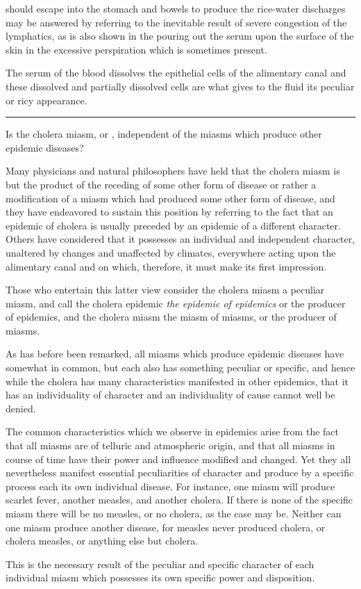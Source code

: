 should escape into the stomach and bowels to produce the rice-water
discharges may be answered by referring to the inevitable result of severe
congestion of the lymphatics, as is also shown in the pouring out the
serum upon the surface of the skin in the excessive perspiration which
is sometimes present.

The serum of the blood dissolves the epithelial cells of the alimentary
canal and these dissolved and partially dissolved cells are what gives to
the fluid its peculiar or ricy appearance.

\plainbreak{1}

Is the cholera miasm, or , independent of the miasms which
produce other epidemic diseases?

Many physicians and natural philosophers have held that the cholera
miasm is but the product of the receding of some other form of disease
or rather a modification of a miasm which had produced some other
form of disease, and they have endeavored to sustain this position by
referring to the fact that an epidemic of cholera is usually preceded by
an epidemic of a different character. Others have considered that it
possesses an individual and independent character, unaltered by changes
and unaffected by climates, everywhere acting upon the alimentary canal
and on which, therefore, it must make its first impression.

Those who entertain this latter view consider the cholera miasm a
peculiar miasm, and call the cholera epidemic \emph{the epidemic of epidemics}
or the producer of epidemics, and the cholera miasm the miasm of
miasms, or the producer of miasms.

As has before been remarked, all miasms which produce epidemic
diseases have somewhat in common, but each also has something peculiar
or specific, and hence while the cholera has many characteristics
manifested in other epidemics, that it has an individuality of character
and an individuality of cause cannot well be denied.

The common characteristics which we observe in epidemics arise
from the fact that all miasms are of telluric and atmospheric origin,
and that all miasms in course of time have their power and influence
modified and changed. Yet they all nevertheless manifest essential
peculiarities of character and produce by a specific process each its own
individual disease. For instance, one miasm will produce scarlet fever,
another measles, and another cholera. If there is none of the specific
miasm there will be no measles, or no cholera, as the case may be.
Neither can one miasm produce another disease, for measles never produced
cholera, or cholera measles, or anything else but cholera.

This is the necessary result of the peculiar and specific character of
each individual miasm which possesses its own specific power and disposition.\endinput